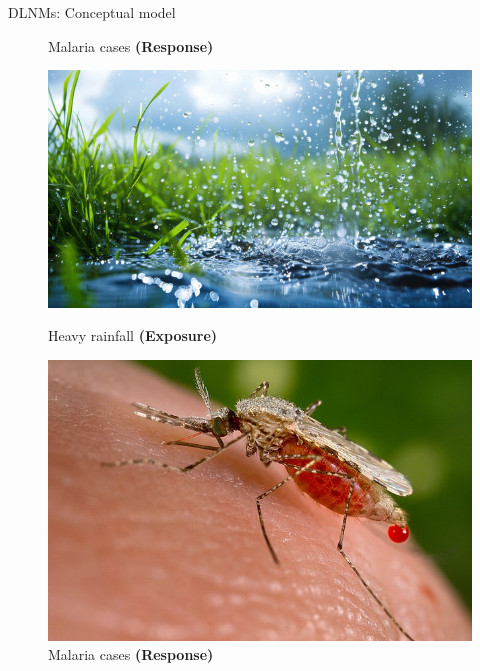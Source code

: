 \documentclass[english]{beamer}
\newcommand{\alertblue}[1]{{\color{blue}#1}}
\begin{document}
\begin{frame}{DLNMs: Conceptual model}
\begin{figure}
\begin{minipage}{0.2\linewidth}
        \caption{\footnotesize Malaria cases \textbf{(Response)}}
    \end{minipage}
\end{figure}
\begin{figure}
    \centering
    \begin{minipage}{0.2\linewidth}
        \includegraphics[width=\linewidth]{images/rainfall.jpg}
        \caption{\footnotesize Heavy rainfall \textbf{(Exposure)}}
    \end{minipage}
    \hspace{0.5cm}
    \hspace{0.5cm}
    \begin{minipage}{0.2\linewidth}
        \centering
        \includegraphics[width=\linewidth]{images/malaria.jpeg}
        \caption{\footnotesize Malaria cases \textbf{(Response)}}
    \end{minipage}
\end{figure}
\end{frame}
\end{document}
